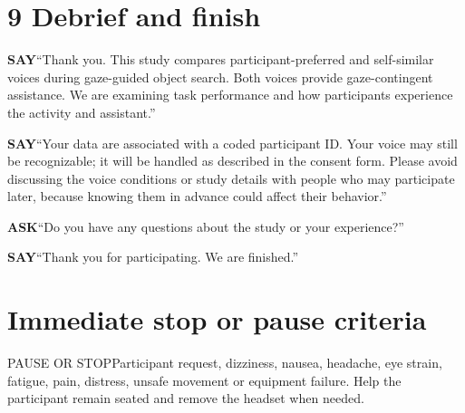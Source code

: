 \documentclass[11pt,letterpaper]{article}
\newcommand{\step}[1]{\Needspace{7\baselineskip}\section{#1}}
\newcommand{\say}[2]{\Needspace{4\baselineskip}\par\textbf{#1}\enspace #2\par}
\newcommand{\meeting}[2]{\Needspace{7\baselineskip}\begin{meetingnote}{#1}#2\end{meetingnote}}
\begin{document}
\step{9 Debrief and finish}
\say{SAY}{``Thank you. This study compares participant-preferred and self-similar voices during gaze-guided object search. Both voices provide gaze-contingent assistance. We are examining task performance and how participants experience the activity and assistant.''}
\say{SAY}{``Your data are associated with a coded participant ID. Your voice may still be recognizable; it will be handled as described in the consent form. Please avoid discussing the voice conditions or study details with people who may participate later, because knowing them in advance could affect their behavior.''}
\say{ASK}{``Do you have any questions about the study or your experience?''}
\say{SAY}{``Thank you for participating. We are finished.''}
\step{Immediate stop or pause criteria}
\meeting{PAUSE OR STOP}{Participant request, dizziness, nausea, headache, eye strain, fatigue, pain, distress, unsafe movement or equipment failure. Help the participant remain seated and remove the headset when needed.}
\end{document}

